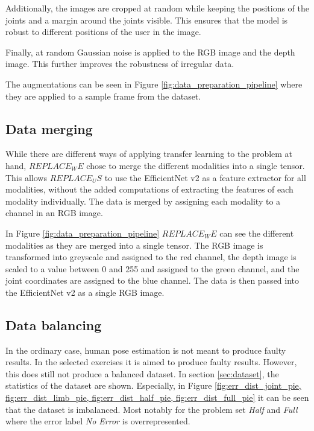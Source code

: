 Additionally, the images are cropped at random while keeping the positions of the joints and a margin around the joints visible. This ensures that the model is robust to different positions of the user in the image. 

Finally, at random Gaussian noise is applied to the RGB image and the depth image. This further improves the robustness of irregular data.

The augmentations can be seen in Figure \ref{fig:data_preparation_pipeline} where they are applied to a sample frame from the dataset.

\subsection{Data merging}

While there are different ways of applying transfer learning to the problem at hand, $REPLACE_WE$ chose to merge the different modalities into a single tensor. This allows $REPLACE_US$ to use the EfficientNet v2 as a feature extractor for all modalities, without the added computations of extracting the features of each modality individually. The data is merged by assigning each modality to a channel in an RGB image.

In Figure \ref{fig:data_preparation_pipeline} $REPLACE_WE$ can see the different modalities as they are merged into a single tensor. The RGB image is transformed into greyscale and assigned to the red channel, the depth image is scaled to a value between 0 and 255 and assigned to the green channel, and the joint coordinates are assigned to the blue channel. The data is then passed into the EfficientNet v2 as a single RGB image.

\subsection{Data balancing}

In the ordinary case, human pose estimation is not meant to produce faulty results. In the selected exercises it is aimed to produce faulty results. However, this does still not produce a balanced dataset. In section \ref{sec:dataset}, the statistics of the dataset are shown. Especially, in Figure \ref{fig:err_dist_joint_pie, fig:err_dist_limb_pie, fig:err_dist_half_pie, fig:err_dist_full_pie} it can be seen that the dataset is imbalanced. Most notably for the problem set \textit{Half} and \textit{Full} where the error label \textit{No Error} is overrepresented.

